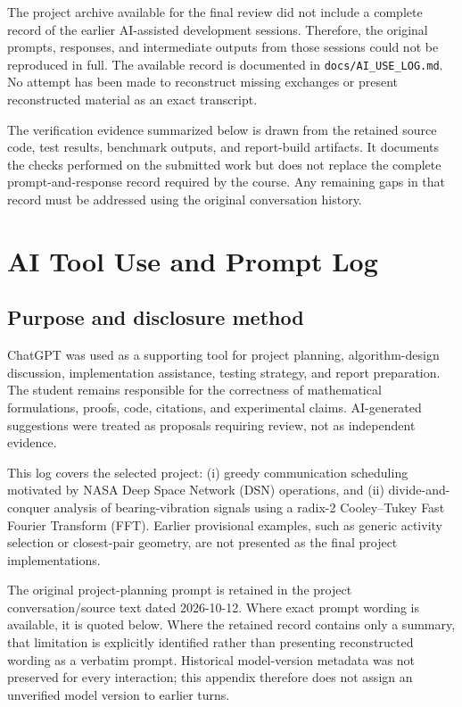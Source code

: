 \documentclass[conference]{IEEEtran}
\begin{document}
The project archive available for the final review did not include a complete record of the earlier AI-assisted development sessions. Therefore, the original prompts, responses, and intermediate outputs from those sessions could not be reproduced in full. The available record is documented in \texttt{docs/AI\_USE\_LOG.md}. No attempt has been made to reconstruct missing exchanges or present reconstructed material as an exact transcript.

The verification evidence summarized below is drawn from the retained source code, test results, benchmark outputs, and report-build artifacts. It documents the checks performed on the submitted work but does not replace the complete prompt-and-response record required by the course. Any remaining gaps in that record must be addressed using the original conversation history.


\section{AI Tool Use and Prompt Log}
\label{app:ai-use}

\subsection{Purpose and disclosure method}
ChatGPT was used as a supporting tool for project planning, algorithm-design discussion,
implementation assistance, testing strategy, and report preparation. The student remains
responsible for the correctness of mathematical formulations, proofs, code, citations,
and experimental claims. AI-generated suggestions were treated as proposals requiring
review, not as independent evidence.

This log covers the selected project: (i) greedy communication scheduling motivated by
NASA Deep Space Network (DSN) operations, and (ii) divide-and-conquer analysis of
bearing-vibration signals using a radix-2 Cooley--Tukey Fast Fourier Transform (FFT).
Earlier provisional examples, such as generic activity selection or closest-pair geometry,
are not presented as the final project implementations.

The original project-planning prompt is retained in the project conversation/source text
dated 2026-10-12. Where exact prompt wording is available, it is quoted below. Where the
retained record contains only a summary, that limitation is explicitly identified rather
than presenting reconstructed wording as a verbatim prompt. Historical model-version
metadata was not preserved for every interaction; this appendix therefore does not assign
an unverified model version to earlier turns.
\end{document}
